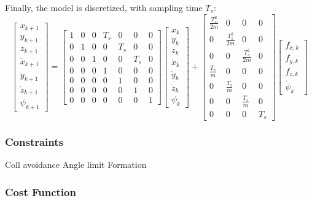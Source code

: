 \documentclass[a4paper, 12pt]{report}
\begin{document}
Finally, the model is discretized, with sampling time $T_s$:
\[\begin{bmatrix} x_{k+1} \\ y_{k+1} \\ z_{k+1} \\ \dot x_{k+1} \\ \dot y_{k+1} \\ \dot z_{k+1} \\ \psi_{k+1} \end{bmatrix}  = 
\begin{bmatrix}  1 & 0 & 0 & T_s & 0 & 0 & 0 \\ 0 & 1 & 0 & 0 & T_s & 0 & 0 \\ 0 & 0 & 1 & 0 & 0 & T_s & 0 \\ 0 & 0 & 0 & 1 & 0 & 0 & 0 \\ 0 & 0 & 0 & 0 & 1 & 0 & 0 \\ 0 & 0 & 0 & 0 & 0 & 1 & 0 \\ 0 & 0 & 0 & 0 & 0 & 0 & 1 \end{bmatrix} 
\begin{bmatrix} x_k \\ y_k \\ z_k \\ \dot x_k \\ \dot y_k \\ \dot z_k \\ \psi_k \end{bmatrix}  + \begin{bmatrix}  \frac{T^2_s}{2m} & 0 & 0 & 0 \\ 0 & \frac{T^2_s}{2m} & 0 & 0 \\ 0 & 0 & \frac{T^2_s}{2m} & 0 \\ \frac{T_s}{m} & 0 & 0 & 0 \\ 0 & \frac{T_s}{m} & 0 & 0 \\ 0 & 0 & \frac{T_s}{m} & 0 \\ 0 & 0 & 0 & T_s \end{bmatrix} \begin{bmatrix} f_{x,k} \\ f_{y,k} \\ f_{z,k} \\ \dot \psi_k \end{bmatrix} \]
\subsubsection{Constraints}
Coll avoidance
Angle limit
Formation
\subsubsection{Cost Function}
\end{document}
